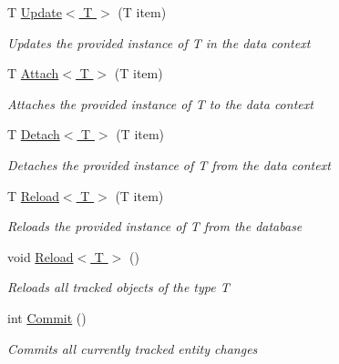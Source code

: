 \begin{DoxyCompactItemize}
T \hyperlink{class_highway_1_1_data_1_1_entity_framework_1_1_contexts_1_1_entity_framework_object_context_afd7de00d4bfcaabfd92b71b34a7cfe33}{Update$<$ T $>$} (T item)
\begin{DoxyCompactList}\small\item\em Updates the provided instance of {\itshape T}  in the data context \end{DoxyCompactList}\item 
T \hyperlink{class_highway_1_1_data_1_1_entity_framework_1_1_contexts_1_1_entity_framework_object_context_ae844d05f0756ca3bb5cb4b43fba41944}{Attach$<$ T $>$} (T item)
\begin{DoxyCompactList}\small\item\em Attaches the provided instance of {\itshape T}  to the data context \end{DoxyCompactList}\item 
T \hyperlink{class_highway_1_1_data_1_1_entity_framework_1_1_contexts_1_1_entity_framework_object_context_a18c4b788c7bcc1baa12d07731edb2295}{Detach$<$ T $>$} (T item)
\begin{DoxyCompactList}\small\item\em Detaches the provided instance of {\itshape T}  from the data context \end{DoxyCompactList}\item 
T \hyperlink{class_highway_1_1_data_1_1_entity_framework_1_1_contexts_1_1_entity_framework_object_context_a5bb2a15fe3102f47871a5532d3a8c095}{Reload$<$ T $>$} (T item)
\begin{DoxyCompactList}\small\item\em Reloads the provided instance of {\itshape T}  from the database \end{DoxyCompactList}\item 
void \hyperlink{class_highway_1_1_data_1_1_entity_framework_1_1_contexts_1_1_entity_framework_object_context_ac65e67686fd1fecb7932266bff554279}{Reload$<$ T $>$} ()
\begin{DoxyCompactList}\small\item\em Reloads all tracked objects of the type {\itshape T}  \end{DoxyCompactList}\item 
int \hyperlink{class_highway_1_1_data_1_1_entity_framework_1_1_contexts_1_1_entity_framework_object_context_ae1f0be0b4cd8e0b81cccb4dbb2e60734}{Commit} ()
\begin{DoxyCompactList}\small\item\em Commits all currently tracked entity changes \end{DoxyCompactList}\item 

\end{DoxyCompactItemize}
